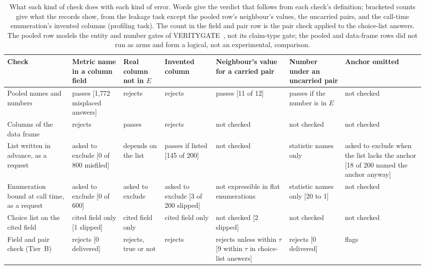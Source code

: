 \documentclass[journal]{IEEEtran}
\begin{document}
\begin{table}[!tp]
\caption{What each kind of check does with each kind of error. Words give the
verdict that follows from each check's definition; bracketed counts give what the
records show, from the leakage task except the pooled row's neighbour's values,
the uncarried pairs, and the call-time enumeration's invented columns (profiling
task). The count in the field and pair row is the pair check applied to the
choice-list answers. The pooled row models the entity and number gates of
VERITYGATE~\cite{gupta2026veritygate}, not its claim-type gate; the pooled and
data-frame rows did not run as arms and form a logical, not an experimental,
comparison.}
\label{tab:coverage}
\centering
\footnotesize
\setlength{\tabcolsep}{3pt}
\renewcommand{\arraystretch}{1.05}
\begin{tabular}{@{}>{\raggedright\arraybackslash}p{3.15cm}*{6}{>{\raggedright\arraybackslash}p{2.2cm}}@{}}
\toprule
Check & Metric name in a column field & Real column not in $E$ & Invented column & Neighbour's value for a carried pair & Number under an uncarried pair & Anchor omitted \\
\midrule
Pooled names and numbers & passes [1{,}772 misplaced answers] & rejects & rejects & passes [11 of 12] & passes if the number is in $E$ & not checked \\
Columns of the data frame & rejects & passes & rejects & not checked & not checked & not checked \\
List written in advance, as a request & asked to exclude [0 of 800 misfiled] & depends on the list & passes if listed [145 of 200] & not checked & statistic names only & asked to exclude when the list lacks the anchor [18 of 200 named the anchor anyway] \\
Enumeration bound at call time, as a request & asked to exclude [0 of 600] & asked to exclude & asked to exclude [3 of 200 slipped] & not expressible in flat enumerations & statistic names only [20 to 1] & not checked \\
Choice list on the cited field & cited field only [1 slipped] & cited field only & cited field only & not checked [2 slipped] & not checked & not checked \\
Field and pair check (Tier~B) & rejects [0 delivered] & rejects, true or not & rejects & rejects unless within $\tau$ [9 within $\tau$ in choice-list answers] & rejects [0 delivered] & flags \\
\bottomrule
\end{tabular}
\end{table}
\end{document}
